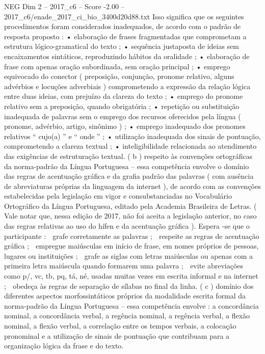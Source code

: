 \begin{textsample}{NEG Dim 2 – 2017\_c6 – Score -2.00 – 2017\_c6/enade\_2017\_ci\_bio\_3400d20d88.txt}
Isso significa que os seguintes procedimentos foram considerados inadequados, de acordo com o padrão de resposta proposto : • elaboração de frases fragmentadas que comprometam a estrutura lógico-gramatical do texto ; • sequência justaposta de ideias sem encaixamentos sintáticos, reproduzindo hábitos da oralidade ; • elaboração de frase com apenas oração subordinada, sem oração principal ; • emprego equivocado do conector ( preposição, conjunção, pronome relativo, alguns advérbios e locuções adverbiais ) comprometendo a expressão da relação lógica entre duas ideias, com prejuízo da clareza do texto ; • emprego do pronome relativo sem a preposição, quando obrigatória ; • repetição ou substituição inadequada de palavras sem o emprego dos recursos oferecidos pela língua ( pronome, advérbio, artigo, sinônimo ) ; • emprego inadequado dos pronomes relativos “ cujo(a) ” e “ onde ” ; • utilização inadequada dos sinais de pontuação, comprometendo a clareza textual ; • inteligibilidade relacionada ao atendimento das exigências de estruturação textual. ( b ) respeito às convenções ortográficas da norma-padrão da Língua Portuguesa – essa competência envolve o domínio das regras de acentuação gráfica e da grafia padrão das palavras ( com ausência de abreviaturas próprias da linguagem da internet ), de acordo com as convenções estabelecidas pela legislação em vigor e consubstanciadas no Vocabulário Ortográfico da Língua Portuguesa, editado pela Academia Brasileira de Letras. ( Vale notar que, nessa edição de 2017, não foi aceita a legislação anterior, no caso das regras relativas ao uso do hífen e da acentuação gráfica ).
Espera -se que o participante :  grafe corretamente as palavras ;  respeite as regras de acentuação gráfica ;  empregue maiúsculas em início de frase, em nomes próprios de pessoas, lugares ou instituições ;  grafe as siglas com letras maiúsculas ou apenas com a primeira letra maiúscula quando formarem uma palavra ;  evite abreviações como p/, vc, tb, pq, tá, né, usadas muitas vezes em escrita informal e na internet ;  obedeça às regras de separação de sílabas no final da linha. ( c ) domínio dos diferentes aspectos morfossintáticos próprios da modalidade escrita formal da norma-padrão da Língua Portuguesa – essa competência envolve : a concordância nominal, a concordância verbal, a regência nominal, a regência verbal, a flexão nominal, a flexão verbal, a correlação entre os tempos verbais, a colocação pronominal e a utilização de sinais de pontuação que contribuam para a organização lógica da frase e do texto.

\end{textsample}
